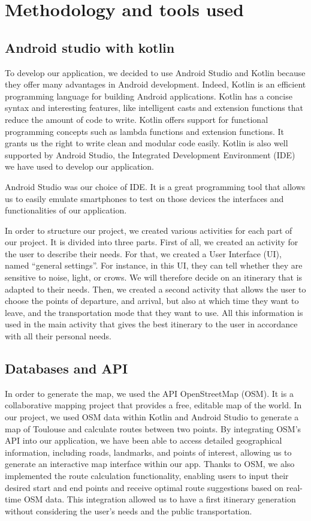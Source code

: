 \section{Methodology and tools used}


\subsection{Android studio with kotlin}


To develop our application, we decided to use Android Studio and Kotlin because they offer many advantages in Android development. Indeed, Kotlin is an efficient programming language for building Android applications. Kotlin has a concise syntax and interesting features, like intelligent casts and extension functions that reduce the amount of code to write. Kotlin offers support for functional programming concepts such as lambda functions and extension functions. It grants us the right to write clean and modular code easily. Kotlin is also well supported by Android Studio, the Integrated Development Environment (IDE) we have used to develop our application.


Android Studio was our choice of IDE. It is a great programming tool that allows us to easily emulate smartphones to test on those devices the interfaces and functionalities of our application.


In order to structure our project, we created various activities for each part of our project. It is divided into three parts. First of all, we created an activity for the user to describe their needs. For that, we created a User Interface (UI), named “general settings”. For instance, in this UI, they can tell whether they are sensitive to noise, light, or crows. We will therefore decide on an itinerary that is adapted to their needs. Then, we created a second activity that allows the user to choose the points of departure, and arrival, but also at which time they want to leave, and the transportation mode that they want to use. All this information is used in the main activity that gives the best itinerary to the user in accordance with all their personal needs.


\subsection{Databases and API}


In order to generate the map, we used the API OpenStreetMap (OSM). It is a collaborative mapping project that provides a free, editable map of the world. In our project, we used OSM data within Kotlin and Android Studio to generate a map of Toulouse and calculate routes between two points. By integrating OSM's API into our application, we have been able to access detailed geographical information, including roads, landmarks, and points of interest, allowing us to generate an interactive map interface within our app. Thanks to OSM, we also implemented the route calculation functionality, enabling users to input their desired start and end points and receive optimal route suggestions based on real-time OSM data. This integration allowed us to have a first itinerary generation without considering the user’s needs and the public transportation.


